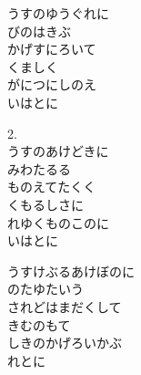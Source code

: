 \documentclass[10pt,b5j]{tarticle} %
\begin{document}
\vspace{1.5em} %
\newcommand{\linespace}{0.5em} %
\newcommand{\blocksize}{0.5\hsize} %
\begin{enumerate} %
    \begin{minipage}[c]{\blocksize}
    
        \vspace{\linespace}
        \item
        うすのゆうぐれに\\
        びのはきぶ\\
        かげすにろいて\\
        くましく\\
        がにつにしのえ\\
        いはとに
        
        \vspace{\linespace}
        \item
        2.	\\
        うすのあけどきに\\
        みわたるる\\
        ものえてたくく\\
        くもるしさに\\
        れゆくものこのに\\
        いはとに
        
        \vspace{\linespace}
        \item
        うすけぶるあけぼのに\\
        のたゆたいう\\
        されどはまだくして\\
        きむのもて\\
        しきのかげろいかぶ\\
        れとに
        

\end{minipage}
\end{enumerate}
\end{document}
